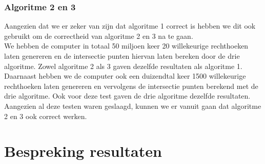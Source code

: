 \documentclass[11pt,a4paper,titlepage]{article}
\begin{document}
			\subsubsection{Algoritme 2 en 3}
				Aangezien dat we er zeker van zijn dat algoritme 1 correct is hebben we dit ook gebruikt om de correctheid van algoritme 2 en 3 na te gaan.\\
				We hebben de computer in totaal 50 miljoen keer 20 willekeurige rechthoeken laten genereren en de intersectie punten hiervan laten bereken door de drie algoritme. Zowel algoritme 2 als 3 gaven dezelfde resultaten als algoritme 1. \\
				Daarnaast hebben we de computer ook een duizendtal keer 1500 willekeurige rechthoeken laten genereren en vervolgens de intersectie punten berekend met de drie algoritme. Ook voor deze test gaven de drie algoritme dezelfde resultaten.\\
				 Aangezien al deze testen waren geslaagd, kunnen we er vanuit gaan dat algoritme 2 en 3 ook correct werken.		
	\section{Bespreking resultaten}
\end{document}
